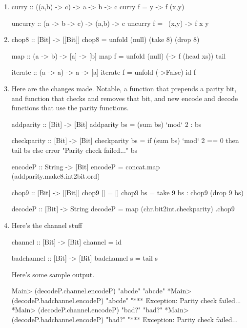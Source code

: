 \documentclass{article}
\begin{document}
\begin{enumerate}
\item 
\begin{code}
curry :: ((a,b) -> c) -> a -> b -> c
curry f = \x y -> f (x,y)

uncurry :: (a -> b -> c) -> (a,b) -> c
uncurry f = \ (x,y) -> f x y
\end{code}

\item 
\begin{code}
chop8 :: [Bit] -> [[Bit]]
chop8 = unfold (null) (take 8) (drop 8)

map :: (a -> b) -> [a] -> [b]
map f = unfold (null) (\xs -> f (head xs)) tail

iterate :: (a -> a) -> a -> [a]
iterate f = unfold (\x->False) id f
\end{code}

\item Here are the changes made. Notable, a function that prepends a parity bit, and function that checks and removes that bit, and new encode and decode functions that use the parity functions. 
\begin{code}
addparity :: [Bit] -> [Bit]
addparity bs = (sum bs) `mod` 2 : bs

checkparity :: [Bit] -> [Bit]
checkparity bs = if (sum bs) `mod` 2 == 0 then tail bs else error "Parity check failed..." bs

encodeP :: String -> [Bit]
encodeP = concat.map (addparity.make8.int2bit.ord)

chop9 :: [Bit] -> [[Bit]]
chop9 [] = []
chop9 bs = take 9 bs : chop9 (drop 9 bs)

decodeP :: [Bit] -> String
decodeP = map (chr.bit2int.checkparity) .chop9
\end{code}

\item Here's the channel stuff
\begin{code}
channel :: [Bit] -> [Bit]
channel = id

badchannel :: [Bit] -> [Bit]
badchannel s = tail s
\end{code}
Here's some sample output.
\begin{code}
Main> (decodeP.channel.encodeP) "abcde"
"abcde"
*Main> (decodeP.badchannel.encodeP) "abcde"
"*** Exception: Parity check failed...
*Main> (decodeP.channel.encodeP) "bad?"
"bad?"
*Main> (decodeP.badchannel.encodeP) "bad?"
"*** Exception: Parity check failed...
\end{code}


\end{enumerate}
\end{document}
